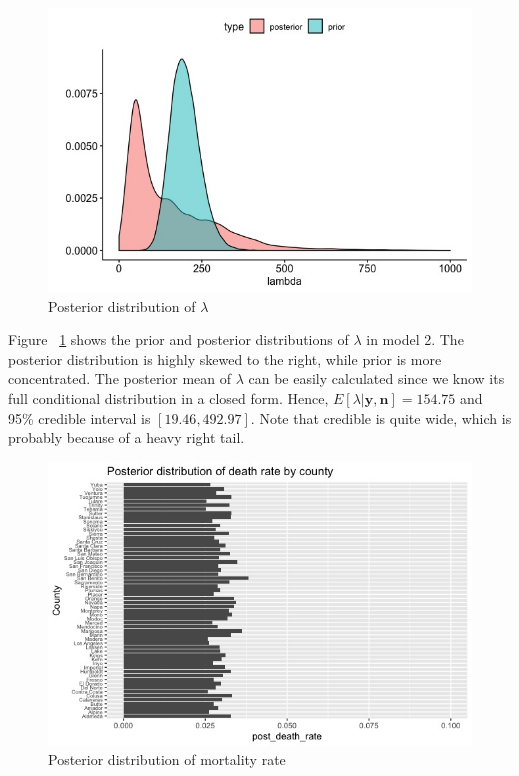 \documentclass[11pt,twocolumn]{asaproc}
\begin{document}
\begin{figure}[t]
\centering\includegraphics[scale=.30]{lambdass.jpeg}
\caption{Posterior distribution of $\lambda$}
\label{fig:lambdass}
\end{figure}

Figure ~\ref{fig:lambdass} shows the prior and posterior distributions of $\lambda$ in model 2. The posterior distribution is highly skewed to the right, while prior is more concentrated. The posterior mean of $\lambda$ can be easily calculated since we know its full conditional distribution in a closed form. Hence, $E[\lambda |\mathbf{y, n}] = 154.75$ and 95\% credible interval is $[19.46, 492.97]$. Note that credible is quite wide, which is probably because of a heavy right tail. 

\begin{figure}[t]
\centering\includegraphics[scale=.30]{postdeaths.jpeg}
\caption{Posterior distribution of mortality rate}
\label{fig:postdeaths}
\end{figure}
\end{document}
